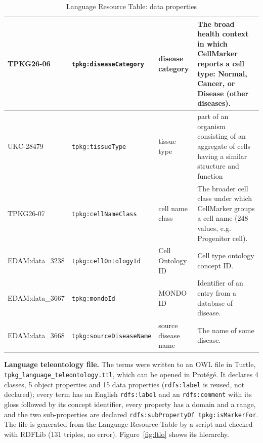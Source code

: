 \begin{table}[htbp]
\begin{tabularx}{\linewidth}{|l|l|l|X|}
\rowcolor{ltloAttr} TPKG26-06 & \texttt{tpkg:diseaseCategory} & disease category & The broad health context in which CellMarker reports a cell type: Normal, Cancer, or Disease (other diseases). \\ \hline
\rowcolor{ltloAttr} UKC-28479 & \texttt{tpkg:tissueType} & tissue type & part of an organism consisting of an aggregate of cells having a similar structure and function \\ \hline
\rowcolor{ltloAttr} TPKG26-07 & \texttt{tpkg:cellNameClass} & cell name class & The broader cell class under which CellMarker groups a cell name (248 values, e.g. Progenitor cell). \\ \hline
\rowcolor{ltloAttr} EDAM:data\_3238 & \texttt{tpkg:cellOntologyId} & Cell Ontology ID & Cell type ontology concept ID. \\ \hline
\rowcolor{ltloAttr} EDAM:data\_3667 & \texttt{tpkg:mondoId} & MONDO ID & Identifier of an entry from a database of disease. \\ \hline
\rowcolor{ltloAttr} EDAM:data\_3668 & \texttt{tpkg:sourceDiseaseName} & source disease name & The name of some disease. \\ \hline
\end{tabularx}
\caption{Language Resource Table: data properties}
\label{tab:lrt-b}
\end{table}

\noindent\textbf{Language teleontology file.} The terms were written to an OWL file in Turtle, \texttt{tpkg\_language\_teleontology.ttl}, which can be opened in Prot\'eg\'e. It declares 4 classes, 5 object properties and 15 data properties (\texttt{rdfs:label} is reused, not declared); every term has an English \texttt{rdfs:label} and an \texttt{rdfs:comment} with its gloss followed by its concept identifier, every property has a domain and a range, and the two sub-properties are declared \texttt{rdfs:subPropertyOf tpkg:isMarkerFor}. The file is generated from the Language Resource Table by a script and checked with RDFLib (131 triples, no error). Figure~\ref{fig:ltlo} shows its hierarchy.

